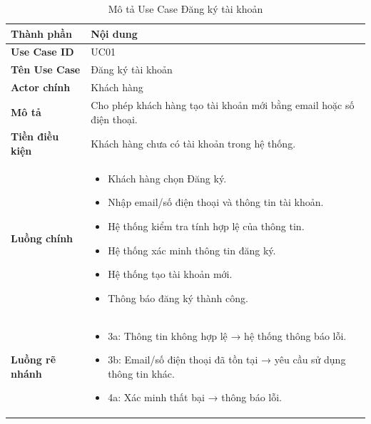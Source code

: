 \begin{longtable}{|L{3cm}|L{11cm}|}

\caption{Mô tả Use Case Đăng ký tài khoản}
\label{tab:mo-ta-uc01-dang-ky}
\\
\hline

\textbf{Thành phần} & \textbf{Nội dung} \\
\hline

\textbf{Use Case ID} & UC01 \\
\hline

\textbf{Tên Use Case} & Đăng ký tài khoản \\
\hline

\textbf{Actor chính} & Khách hàng \\
\hline

\textbf{Mô tả} & Cho phép khách hàng tạo tài khoản mới bằng email hoặc số điện thoại. \\
\hline

\textbf{Tiền điều kiện} & Khách hàng chưa có tài khoản trong hệ thống. \\
\hline

\textbf{Luồng chính} &
\begin{itemize}[leftmargin=*,topsep=2pt,itemsep=2pt]
    \item Khách hàng chọn Đăng ký.
    \item Nhập email/số điện thoại và thông tin tài khoản.
    \item Hệ thống kiểm tra tính hợp lệ của thông tin.
    \item Hệ thống xác minh thông tin đăng ký.
    \item Hệ thống tạo tài khoản mới.
    \item Thông báo đăng ký thành công.
\end{itemize}
\\
\hline

\textbf{Luồng rẽ nhánh} &
\begin{itemize}[leftmargin=*,topsep=2pt,itemsep=2pt]
    \item 3a: Thông tin không hợp lệ → hệ thống thông báo lỗi.
    \item 3b: Email/số điện thoại đã tồn tại → yêu cầu sử dụng thông tin khác.
    \item 4a: Xác minh thất bại → thông báo lỗi.
\end{itemize}
\\
\hline
\end{longtable}
